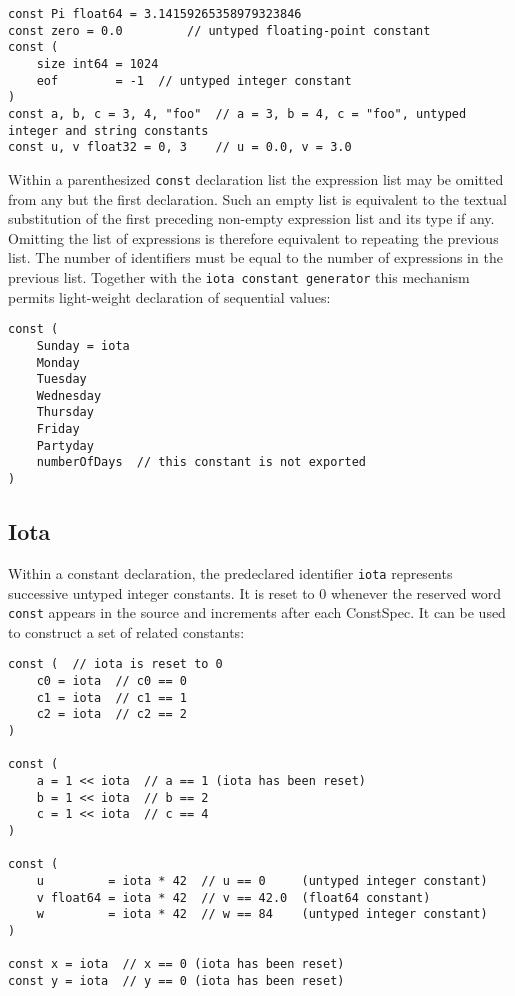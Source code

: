 \begin{Verbatim}[frame=single]
const Pi float64 = 3.14159265358979323846
const zero = 0.0         // untyped floating-point constant
const (
    size int64 = 1024
    eof        = -1  // untyped integer constant
)
const a, b, c = 3, 4, "foo"  // a = 3, b = 4, c = "foo", untyped integer and string constants
const u, v float32 = 0, 3    // u = 0.0, v = 3.0
\end{Verbatim}

Within a parenthesized \texttt{const} declaration list the expression
list may be omitted from any but the first declaration. Such an empty
list is equivalent to the textual substitution of the first preceding
non-empty expression list and its type if any. Omitting the list of
expressions is therefore equivalent to repeating the previous list. The
number of identifiers must be equal to the number of expressions in the
previous list. Together with the \texttt{iota constant
generator} this mechanism permits light-weight declaration of sequential
values:

\begin{Verbatim}[frame=single]
const (
    Sunday = iota
    Monday
    Tuesday
    Wednesday
    Thursday
    Friday
    Partyday
    numberOfDays  // this constant is not exported
)
\end{Verbatim}

\subsection*{Iota}

Within a constant declaration, the
predeclared identifier \texttt{iota} represents successive untyped
integer constants. It is reset to 0 whenever the
reserved word \texttt{const} appears in the source and increments after
each ConstSpec. It can be used to construct a set
of related constants:

\begin{Verbatim}[frame=single]
const (  // iota is reset to 0
    c0 = iota  // c0 == 0
    c1 = iota  // c1 == 1
    c2 = iota  // c2 == 2
)

const (
    a = 1 << iota  // a == 1 (iota has been reset)
    b = 1 << iota  // b == 2
    c = 1 << iota  // c == 4
)

const (
    u         = iota * 42  // u == 0     (untyped integer constant)
    v float64 = iota * 42  // v == 42.0  (float64 constant)
    w         = iota * 42  // w == 84    (untyped integer constant)
)

const x = iota  // x == 0 (iota has been reset)
const y = iota  // y == 0 (iota has been reset)
\end{Verbatim}


